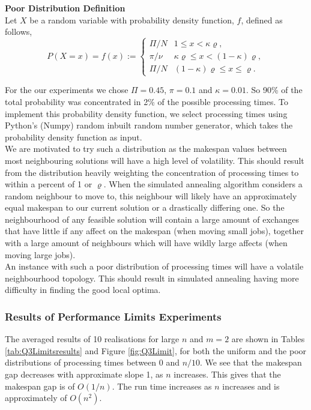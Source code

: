 \documentclass[12pt,a4paper,reqno]{article}
\begin{document}
{\bf Poor Distribution Definition}\\
Let $X$ be a random variable with probability density function, $f$, defined as follows,
\[
P(X=x)=f(x) := 
\begin{cases} 
      \Pi/N & 1 \leq x < \kappa\varrho, \\
      \pi/\nu & \kappa\varrho \leq x < (1-\kappa)\varrho, \\
      \Pi/N & (1-\kappa)\varrho\leq x \leq \varrho .
   \end{cases}\textbf{}
\]

For the our experiments we chose $\Pi=0.45$, $\pi=0.1$ and $\kappa=0.01$. So 90\% of the total probability was concentrated in 2\% of the possible processing times. To implement this probability density function, we select processing times using Python's (Numpy) random inbuilt random number generator, which takes the probability density function as input. \\

We are motivated to try such a distribution as the makespan values between most neighbouring solutions will have a high level of volatility. This should result from the distribution heavily weighting the concentration of processing times to within a percent of 1 or $\varrho$. When the simulated annealing algorithm considers a random neighbour to move to, this neighbour will likely have an approximately equal makespan to our current solution or a drastically differing one. So the neighbourhood of any feasible solution will contain a large amount of exchanges that have little if any affect on the makespan (when moving small jobs), together with a large amount of neighbours which will have wildly large affects (when moving large jobs). \\

An instance with such a poor distribution of processing times will have a volatile neighbourhood topology. This should result in simulated annealing having more difficulty in finding the good local optima.

\subsubsection{Results of Performance Limits Experiments}
The averaged results of 10 realisations for large $n$ and $m=2$ are shown in Tables \ref{tab:Q3Limitsresults} and Figure \ref{fig:Q3Limit}, for both the uniform and the poor distributions of processing times between 0 and $n/10$. We see that the makespan gap decreases with approximate slope 1, as $n$ increases. This gives that the makespan gap is of $O(1/n)$. The run time increases as $n$ increases and is approximately of $O(n^2)$. \\
\end{document}
